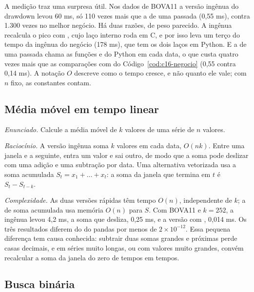 A medição traz uma surpresa útil. Nos dados de BOVA11 a versão ingênua do drawdown levou 60 ms, só 110 vezes mais que a de uma passada (0,55 ms), contra 1.300 vezes no melhor negócio. Há duas razões, de peso parecido. A ingênua recalcula o pico com , cujo laço interno roda em C, e por isso leva um terço do tempo da ingênua do negócio (178 ms), que tem os dois laços em Python. E a de uma passada chama as funções  e  do Python em cada data, o que custa quatro vezes mais que as comparações com  do Código~\ref{cod:c16-negocio} (0,55 contra 0,14 ms). A notação $O$ descreve como o tempo cresce, e não quanto ele vale; com $n$ fixo, as constantes contam.

\subsection{Média móvel em tempo linear}

\emph{Enunciado.} Calcule a média móvel de $k$ valores de uma série de $n$ valores.

\emph{Raciocínio.} A versão ingênua soma $k$ valores em cada data, $O(nk)$. Entre uma janela e a seguinte, entra um valor e sai outro, de modo que a soma pode deslizar com uma adição e uma subtração por data. Uma alternativa vetorizada usa a soma acumulada $S_t = x_1 + \dots + x_t$: a soma da janela que termina em $t$ é $S_t - S_{t-k}$.



\emph{Complexidade.} As duas versões rápidas têm tempo $O(n)$, independente de $k$; a de soma acumulada usa memória $O(n)$ para $S$. Com BOVA11 e $k = 252$, a ingênua levou 4,2 ms, a soma que desliza, 0,25 ms, e a versão com , 0,014 ms. Os três resultados diferem do  do pandas por menos de $2 \times 10^{-12}$. Essa pequena diferença tem causa conhecida: subtrair duas somas grandes e próximas perde casas decimais, e em séries muito longas, ou com valores muito grandes, convém recalcular a soma da janela do zero de tempos em tempos.

\subsection{Busca binária}

